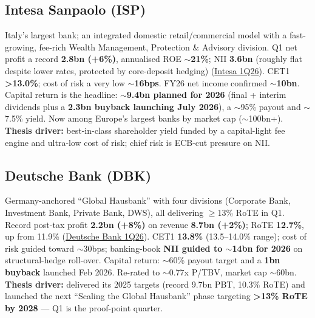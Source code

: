 \documentclass[10pt,a4paper]{article}
\begin{document}
\subsection*{Intesa Sanpaolo (ISP)}
Italy's largest bank; an integrated domestic retail/commercial model with a fast-growing, fee-rich Wealth Management, Protection \& Advisory division. Q1 net profit a record \textbf{\texteuro2.8bn (+6\%)}, annualised ROE $\sim$\textbf{21\%}; NII \textbf{\texteuro3.6bn} (roughly flat despite lower rates, protected by core-deposit hedging) (\href{https://group.intesasanpaolo.com/en/newsroom/all-news/news/2026/intesa-sanpaolo-1q26-results}{Intesa 1Q26}). CET1 \textbf{>13.0\%}; cost of risk a very low $\sim$\textbf{16bps}. FY26 net income confirmed $\sim$\textbf{\texteuro10bn}. Capital return is the headline: $\sim$\textbf{\texteuro9.4bn planned for 2026} (final + interim dividends plus a \textbf{\texteuro2.3bn buyback launching July 2026}), a $\sim$95\% payout and $\sim$7.5\% yield. Now among Europe's largest banks by market cap ($\sim$\texteuro100bn+). \textbf{Thesis driver:} best-in-class shareholder yield funded by a capital-light fee engine and ultra-low cost of risk; chief risk is ECB-cut pressure on NII.

\subsection*{Deutsche Bank (DBK)}
Germany-anchored ``Global Hausbank'' with four divisions (Corporate Bank, Investment Bank, Private Bank, DWS), all delivering $\geq$13\% RoTE in Q1. Record post-tax profit \textbf{\texteuro2.2bn (+8\%)} on revenue \textbf{\texteuro8.7bn (+2\%)}; RoTE \textbf{12.7\%}, up from 11.9\% (\href{https://www.db.com/news/detail/20260429-deutsche-bank-reports-first-quarter-2026-results}{Deutsche Bank 1Q26}). CET1 \textbf{13.8\%} (13.5--14.0\% range); cost of risk guided toward $\sim$30bps; banking-book \textbf{NII guided to $\sim$\texteuro14bn for 2026} on structural-hedge roll-over. Capital return: $\sim$60\% payout target and a \textbf{\texteuro1bn buyback} launched Feb 2026. Re-rated to $\sim$0.77x P/TBV, market cap $\sim$\texteuro60bn. \textbf{Thesis driver:} delivered its 2025 targets (record \texteuro9.7bn PBT, 10.3\% RoTE) and launched the next ``Scaling the Global Hausbank'' phase targeting \textbf{>13\% RoTE by 2028} --- Q1 is the proof-point quarter.
\end{document}
